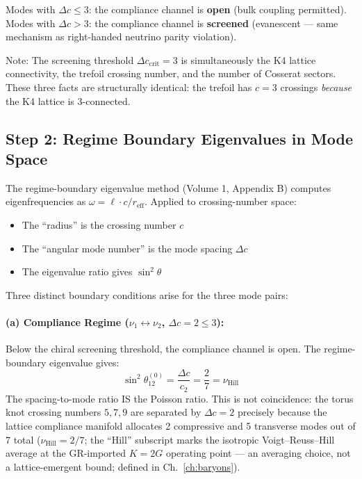 \noindent
Modes with $\Delta c \le 3$: the compliance channel is \textbf{open} (bulk coupling permitted). \\
Modes with $\Delta c > 3$: the compliance channel is \textbf{screened} (evanescent — same mechanism as right-handed neutrino parity violation).

\medskip\noindent
Note: The screening threshold $\Delta c_{\text{crit}} = 3$ is simultaneously the K4 lattice connectivity, the trefoil crossing number, and the number of Cosserat sectors. These three facts are structurally identical: the trefoil has $c = 3$ crossings \textit{because} the K4 lattice is 3-connected.

\subsection{Step 2: Regime Boundary Eigenvalues in Mode Space}
\label{sec:pmns_eigenvalues}

The regime-boundary eigenvalue method (Volume 1, Appendix B) computes eigenfrequencies as $\omega = \ell \cdot c / r_{\text{eff}}$. Applied to crossing-number space:

\begin{itemize}
    \item The ``radius'' is the crossing number $c$
    \item The ``angular mode number'' is the mode spacing $\Delta c$
    \item The eigenvalue ratio gives $\sin^2\theta$
\end{itemize}

Three distinct boundary conditions arise for the three mode pairs:

\paragraph{(a) Compliance Regime ($\nu_1 \leftrightarrow \nu_2$, $\Delta c = 2 \le 3$):}
Below the chiral screening threshold, the compliance channel is open. The regime-boundary eigenvalue gives:
\begin{equation}
    \sin^2\theta_{12}^{(0)} = \frac{\Delta c}{c_2} = \frac{2}{7} = \nu_{\text{Hill}}
    \label{eq:theta12_leading}
\end{equation}
The spacing-to-mode ratio IS the Poisson ratio. This is not coincidence: the torus knot crossing numbers $5, 7, 9$ are separated by $\Delta c = 2$ precisely because the lattice compliance manifold allocates 2 compressive and 5 transverse modes out of 7 total ($\nu_{\text{Hill}} = 2/7$; the ``Hill'' subscript marks the isotropic Voigt--Reuss--Hill average at the GR-imported $K = 2G$ operating point --- an averaging choice, not a lattice-emergent bound; defined in Ch.~\ref{ch:baryons}).


